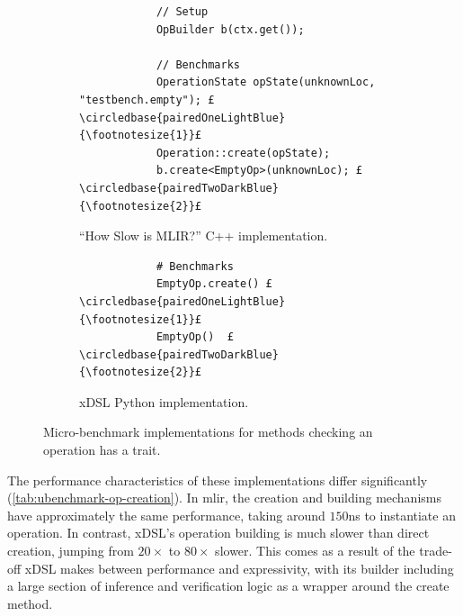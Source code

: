\begin{figure}[H]
    \centering
    \begin{subfigure}[b]{0.45\textwidth}
       \centering
        \begin{verbatim}
            // Setup
            OpBuilder b(ctx.get());

            // Benchmarks
            OperationState opState(unknownLoc, "testbench.empty"); £\circledbase{pairedOneLightBlue}{\footnotesize{1}}£
            Operation::create(opState);
            b.create<EmptyOp>(unknownLoc); £\circledbase{pairedTwoDarkBlue}{\footnotesize{2}}£
        \end{verbatim}
        \caption{``How Slow is MLIR?'' C++ implementation.}
        \label{listing:ubenchmark-op-creation-bench-mlir}
    \end{subfigure}
    \hfill
    \begin{subfigure}[b]{0.45\textwidth}
        \centering
        \begin{verbatim}
            # Benchmarks
            EmptyOp.create() £\circledbase{pairedOneLightBlue}{\footnotesize{1}}£
            EmptyOp()  £\circledbase{pairedTwoDarkBlue}{\footnotesize{2}}£
        \end{verbatim}
        \footnotesize\vspace{3.5em}
        \caption{xDSL Python implementation.}
        \label{listing:ubenchmark-op-creation-bench-xdsl}
    \end{subfigure}
    \vspace{1em}
    \captionsetup{name=Listing}
    \caption{Micro-benchmark implementations for methods checking an operation has a trait.}
    \label{listing:ubenchmark-op-creation-bench}
\end{figure}

The performance characteristics of these implementations differ significantly (\autoref{tab:ubenchmark-op-creation}).
In \ac{mlir}, the creation and building mechanisms have approximately the same performance, taking around $150$ns to instantiate an operation. In contrast, xDSL's operation building is much slower than direct creation, jumping from $20\times$ to $80\times$ slower. This comes as a result of the trade-off xDSL makes between performance and expressivity, with its builder including a large section of inference and verification logic as a wrapper around the create method.


